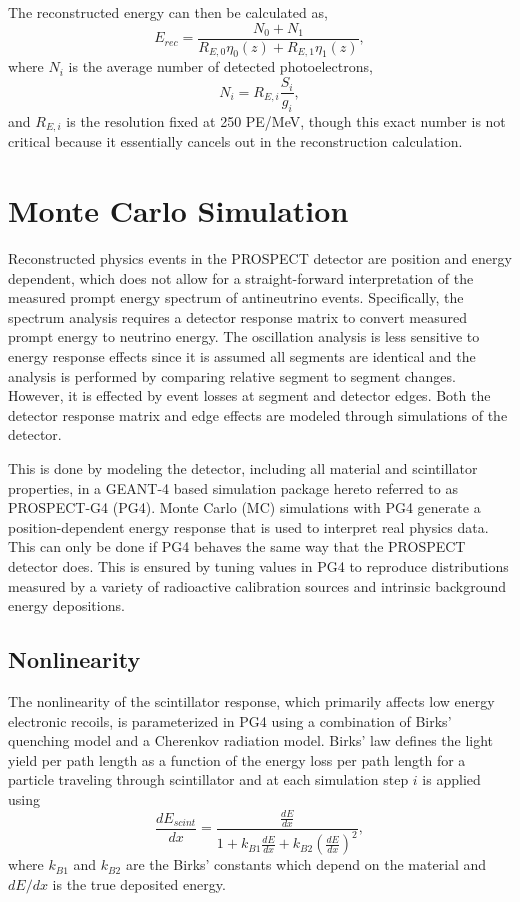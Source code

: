 The reconstructed energy can then be calculated as,
\begin{equation}
	E_{rec} = \frac{N_0 + N_1}{{R_{E,0}}{\eta_0(z)} + {R_{E,1}}{\eta_1(z)}},
\end{equation}
where $N_i$ is the average number of detected photoelectrons,
\begin{equation}
	N_i = R_{E,i}\frac{S_i}{g_i},
\end{equation}
and $R_{E,i}$ is the resolution fixed at 250 PE/MeV, though this exact number is not critical because it essentially cancels out in the reconstruction calculation.



\section{Monte Carlo Simulation}

Reconstructed physics events in the PROSPECT detector are position and energy dependent, which does not allow for a straight-forward interpretation of the measured prompt energy spectrum of antineutrino events.
Specifically, the spectrum analysis requires a detector response matrix to convert measured prompt energy to neutrino energy.
The oscillation analysis is less sensitive to energy response effects since it is assumed all segments are identical and the analysis is performed by comparing relative segment to segment changes. 
However, it is effected by event losses at segment and detector edges. 
Both the detector response matrix and edge effects are modeled through simulations of the detector. 

This is done by modeling the detector, including all material and scintillator properties, in a GEANT-4 based simulation package hereto referred to as PROSPECT-G4 (PG4).
Monte Carlo (MC) simulations with PG4 generate a position-dependent energy response that is used to interpret real physics data. 
This can only be done if PG4 behaves the same way that the PROSPECT detector does. 
This is ensured by tuning values in PG4 to reproduce distributions measured by a variety of radioactive calibration sources and intrinsic background energy depositions.

\subsection{Nonlinearity}

The nonlinearity of the scintillator response, which primarily affects low energy electronic recoils, is parameterized in PG4 using a combination of Birks' quenching model \cite{BIRKS1964269} and a Cherenkov radiation model.
Birks' law defines the light yield per path length as a function of the energy loss per path length for a particle traveling through scintillator and at each simulation step $i$ is applied using
\begin{equation}
	\frac{dE_{scint}}{dx} = \frac{\frac{dE}{dx}}{1 + k_{B1}\frac{dE}{dx} + k_{B2}\left(\frac{dE}{dx}\right)^2},
\end{equation}
where $k_{B1}$ and $k_{B2}$ are the Birks' constants which depend on the material and $dE/dx$ is the true deposited energy.

